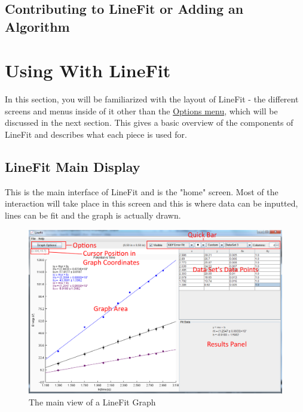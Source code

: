 \documentclass[titlepage,12pt]{article}
\begin{document}
\subsection{Contributing to LineFit or Adding an Algorithm}
\label{sec:contribute}




\section{Using With LineFit}
In this section, you will be familiarized with the layout of LineFit - the different screens and menus inside of it other than the \hyperref[sec:options]{Options menu}, which will be discussed in the next section. This gives a basic overview of the components of LineFit and describes what each piece is used for.



\subsection{LineFit Main Display}

This is the main interface of LineFit and is the "home" screen. Most of the interaction will take place in this screen and this is where data can be inputted, lines can be fit and the graph is actually drawn.

\begin{figure}[ht!]
\centering
\includegraphics[width=15cm]{images/mainLineFitImage.png}
\caption{The main view of a LineFit Graph}
\end{figure}
\end{document}
